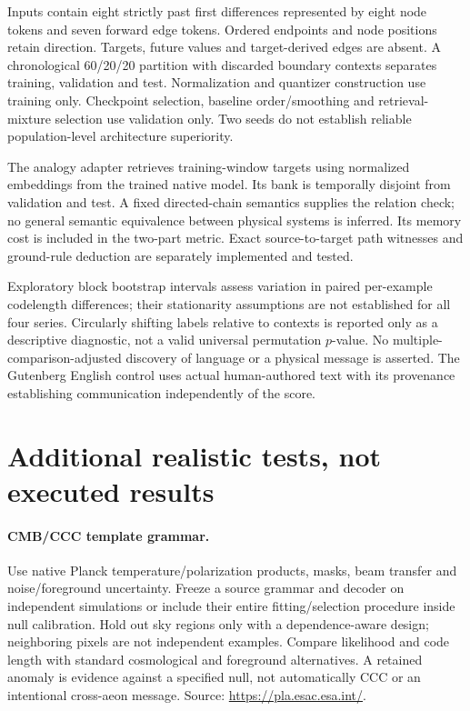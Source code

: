 Inputs contain eight strictly past first differences represented by eight node tokens and seven forward edge tokens. Ordered endpoints and node positions retain direction. Targets, future values and target-derived edges are absent. A chronological 60/20/20 partition with discarded boundary contexts separates training, validation and test. Normalization and quantizer construction use training only. Checkpoint selection, baseline order/smoothing and retrieval-mixture selection use validation only. Two seeds do not establish reliable population-level architecture superiority.

The analogy adapter retrieves training-window targets using normalized embeddings from the trained native model. Its bank is temporally disjoint from validation and test. A fixed directed-chain semantics supplies the relation check; no general semantic equivalence between physical systems is inferred. Its memory cost is included in the two-part metric. Exact source-to-target path witnesses and ground-rule deduction are separately implemented and tested.

Exploratory block bootstrap intervals assess variation in paired per-example codelength differences; their stationarity assumptions are not established for all four series. Circularly shifting labels relative to contexts is reported only as a descriptive diagnostic, not a valid universal permutation $p$-value. No multiple-comparison-adjusted discovery of language or a physical message is asserted. The Gutenberg English control uses actual human-authored text with its provenance establishing communication independently of the score.

\section{Additional realistic tests, not executed results}

\paragraph{CMB/CCC template grammar.} Use native Planck temperature/polarization products, masks, beam transfer and noise/foreground uncertainty. Freeze a source grammar and decoder on independent simulations or include their entire fitting/selection procedure inside null calibration. Hold out sky regions only with a dependence-aware design; neighboring pixels are not independent examples. Compare likelihood and code length with standard cosmological and foreground alternatives. A retained anomaly is evidence against a specified null, not automatically CCC or an intentional cross-aeon message. Source: \url{https://pla.esac.esa.int/}.

